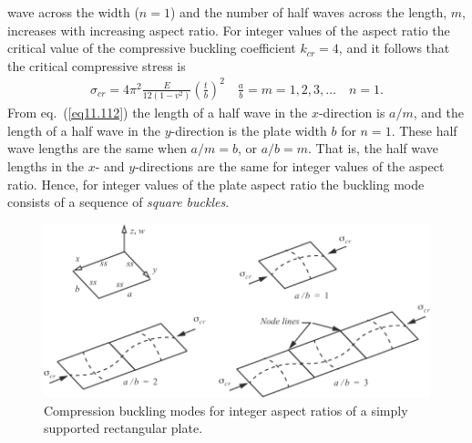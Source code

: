 \documentclass{AeroStructure-ERJohnson}
\begin{document}
\noindent wave across the width ($n=1$) and the number of half waves across the length, $m$, increases with increasing aspect ratio. For integer values of the aspect ratio the critical value of the compressive buckling coefficient $k_{c r}=4$, and it follows that the critical compressive stress is
\begin{align}\label{eq11.115}
\sigma_{c r}=4 \pi^{2} \frac{E}{12\left(1-v^{2}\right)}\left(\frac{t}{b}\right)^{2} \quad \frac{a}{b}=m=1,2,3, \ldots \quad n=1.
\end{align}
From eq.~(\ref{eq11.112}) the length of a half wave in the $x$-direction is $a/m$, and the length of a half wave in the $y$-direction is the plate width $b$ for $n=1$. These half wave lengths are the same when $a/m=b$, or $a/b=m$. That is, the half wave lengths in the $x$- and $y$-directions are the same for integer values of the aspect ratio. Hence, for integer values of the plate aspect ratio the buckling mode consists of a sequence of \textit{square buckles}.

\begin{figure}[!h]
\centerline{\includegraphics{Figure_11-27.pdf}}
\caption{Compression buckling modes for integer aspect ratios of a simply supported rectangular plate.} \label{fig11.27}
\end{figure}

\clearpage
\end{document}
